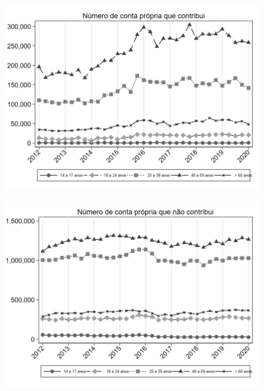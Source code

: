 \begin{frame}[label=_composicao_demografica_faixa_etaria_n_cpropriaC]{}
\textit{\hyperlink{_composicao_demografica_faixa_etaria}{}}
\begin{figure}
  \centering
  \includegraphics[width=1.0\linewidth]{../../analysis/output/composicao_demografica/faixa_etaria/_composicao_demografica_faixa_etaria_n_cpropriaC.png}
  \caption{}
  \label{fig:_composicao_demografica_faixa_etaria_n_cpropriaC}
\end{figure}
\end{frame}

\begin{frame}[label=_composicao_demografica_faixa_etaria_n_cpropriaNc]{}
\textit{\hyperlink{_composicao_demografica_faixa_etaria}{}}
\begin{figure}
  \centering
  \includegraphics[width=1.0\linewidth]{../../analysis/output/composicao_demografica/faixa_etaria/_composicao_demografica_faixa_etaria_n_cpropriaNc.png}
  \caption{}
  \label{fig:_composicao_demografica_faixa_etaria_n_cpropriaNc}
\end{figure}
\end{frame}